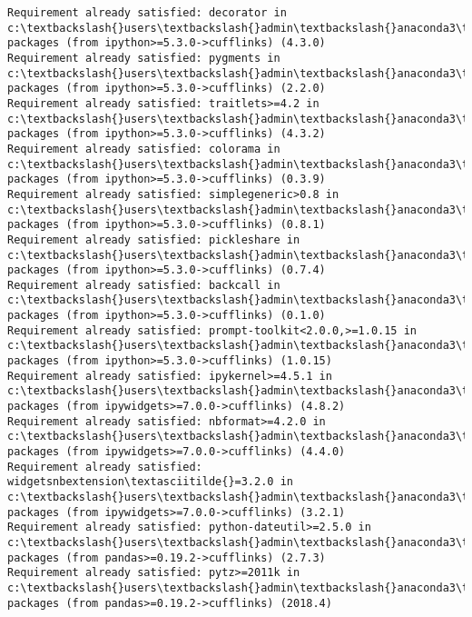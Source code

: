\documentclass[11pt]{article}
\begin{document}
\begin{Verbatim}[commandchars=\\\{\}]
Requirement already satisfied: decorator in c:\textbackslash{}users\textbackslash{}admin\textbackslash{}anaconda3\textbackslash{}lib\textbackslash{}site-packages (from ipython>=5.3.0->cufflinks) (4.3.0)
Requirement already satisfied: pygments in c:\textbackslash{}users\textbackslash{}admin\textbackslash{}anaconda3\textbackslash{}lib\textbackslash{}site-packages (from ipython>=5.3.0->cufflinks) (2.2.0)
Requirement already satisfied: traitlets>=4.2 in c:\textbackslash{}users\textbackslash{}admin\textbackslash{}anaconda3\textbackslash{}lib\textbackslash{}site-packages (from ipython>=5.3.0->cufflinks) (4.3.2)
Requirement already satisfied: colorama in c:\textbackslash{}users\textbackslash{}admin\textbackslash{}anaconda3\textbackslash{}lib\textbackslash{}site-packages (from ipython>=5.3.0->cufflinks) (0.3.9)
Requirement already satisfied: simplegeneric>0.8 in c:\textbackslash{}users\textbackslash{}admin\textbackslash{}anaconda3\textbackslash{}lib\textbackslash{}site-packages (from ipython>=5.3.0->cufflinks) (0.8.1)
Requirement already satisfied: pickleshare in c:\textbackslash{}users\textbackslash{}admin\textbackslash{}anaconda3\textbackslash{}lib\textbackslash{}site-packages (from ipython>=5.3.0->cufflinks) (0.7.4)
Requirement already satisfied: backcall in c:\textbackslash{}users\textbackslash{}admin\textbackslash{}anaconda3\textbackslash{}lib\textbackslash{}site-packages (from ipython>=5.3.0->cufflinks) (0.1.0)
Requirement already satisfied: prompt-toolkit<2.0.0,>=1.0.15 in c:\textbackslash{}users\textbackslash{}admin\textbackslash{}anaconda3\textbackslash{}lib\textbackslash{}site-packages (from ipython>=5.3.0->cufflinks) (1.0.15)
Requirement already satisfied: ipykernel>=4.5.1 in c:\textbackslash{}users\textbackslash{}admin\textbackslash{}anaconda3\textbackslash{}lib\textbackslash{}site-packages (from ipywidgets>=7.0.0->cufflinks) (4.8.2)
Requirement already satisfied: nbformat>=4.2.0 in c:\textbackslash{}users\textbackslash{}admin\textbackslash{}anaconda3\textbackslash{}lib\textbackslash{}site-packages (from ipywidgets>=7.0.0->cufflinks) (4.4.0)
Requirement already satisfied: widgetsnbextension\textasciitilde{}=3.2.0 in c:\textbackslash{}users\textbackslash{}admin\textbackslash{}anaconda3\textbackslash{}lib\textbackslash{}site-packages (from ipywidgets>=7.0.0->cufflinks) (3.2.1)
Requirement already satisfied: python-dateutil>=2.5.0 in c:\textbackslash{}users\textbackslash{}admin\textbackslash{}anaconda3\textbackslash{}lib\textbackslash{}site-packages (from pandas>=0.19.2->cufflinks) (2.7.3)
Requirement already satisfied: pytz>=2011k in c:\textbackslash{}users\textbackslash{}admin\textbackslash{}anaconda3\textbackslash{}lib\textbackslash{}site-packages (from pandas>=0.19.2->cufflinks) (2018.4)

\end{Verbatim}
\end{document}
